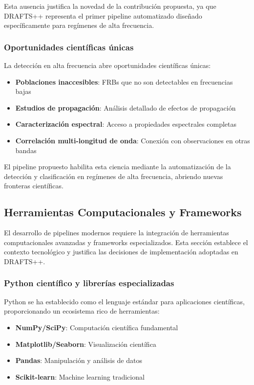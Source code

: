 Esta ausencia justifica la novedad de la contribución propuesta, ya que DRAFTS++ representa el primer pipeline automatizado diseñado específicamente para regímenes de alta frecuencia.

\subsubsection{Oportunidades científicas únicas}

La detección en alta frecuencia abre oportunidades científicas únicas:

\begin{itemize}
    \item \textbf{Poblaciones inaccesibles}: FRBs que no son detectables en frecuencias bajas
    \item \textbf{Estudios de propagación}: Análisis detallado de efectos de propagación
    \item \textbf{Caracterización espectral}: Acceso a propiedades espectrales completas
    \item \textbf{Correlación multi-longitud de onda}: Conexión con observaciones en otras bandas
\end{itemize}

El pipeline propuesto habilita esta ciencia mediante la automatización de la detección y clasificación en regímenes de alta frecuencia, abriendo nuevas fronteras científicas.

\subsection{Herramientas Computacionales y Frameworks}

El desarrollo de pipelines modernos requiere la integración de herramientas computacionales avanzadas y frameworks especializados. Esta sección establece el contexto tecnológico y justifica las decisiones de implementación adoptadas en DRAFTS++.

\subsubsection{Python científico y librerías especializadas}

Python se ha establecido como el lenguaje estándar para aplicaciones científicas, proporcionando un ecosistema rico de herramientas:

\begin{itemize}
    \item \textbf{NumPy/SciPy}: Computación científica fundamental
    \item \textbf{Matplotlib/Seaborn}: Visualización científica
    \item \textbf{Pandas}: Manipulación y análisis de datos
    \item \textbf{Scikit-learn}: Machine learning tradicional
\end{itemize}

